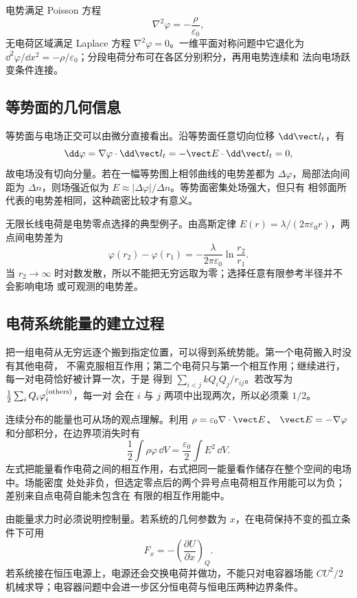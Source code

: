 电势满足 Poisson 方程
\begin{equation}
 \boxed{\nabla^2\varphi=-\frac\rho{\varepsilon_0}},
\end{equation}
无电荷区域满足 Laplace 方程 $\nabla^2\varphi=0$。一维平面对称问题中它退化为
$\dd^2\varphi/\dd x^2=-\rho/\varepsilon_0$；分段电荷分布可在各区分别积分，再用电势连续和
法向电场跃变条件连接。

\subsection*{等势面的几何信息}

等势面与电场正交可以由微分直接看出。沿等势面任意切向位移 $\dd\vect l_t$，有
\begin{equation}
 \dd\varphi=\nabla\varphi\cdot\dd\vect l_t
 =-\vect E\cdot\dd\vect l_t=0,
\end{equation}
故电场没有切向分量。若在一幅等势图上相邻曲线的电势差都为 $\Delta\varphi$，局部法向间距为
$\Delta n$，则场强近似为 $E\approx|\Delta\varphi|/\Delta n$。等势面密集处场强大，但只有
相邻面所代表的电势差相同，这种疏密比较才有意义。

无限长线电荷是电势零点选择的典型例子。由高斯定律
$E(r)=\lambda/(2\pi\varepsilon_0r)$，两点间电势差为
\begin{equation}
 \varphi(r_2)-\varphi(r_1)
 =-\frac\lambda{2\pi\varepsilon_0}\ln\frac{r_2}{r_1}.
\end{equation}
当 $r_2\to\infty$ 时对数发散，所以不能把无穷远取为零；选择任意有限参考半径并不会影响电场
或可观测的电势差。

\subsection*{电荷系统能量的建立过程}

把一组电荷从无穷远逐个搬到指定位置，可以得到系统势能。第一个电荷搬入时没有其他电荷，
不需克服相互作用；第二个电荷只与第一个相互作用；继续进行，每一对电荷恰好被计算一次，于是
得到 $\sum_{i<j}kQ_iQ_j/r_{ij}$。若改写为 $\frac12\sum_iQ_i\varphi_i^{(\rm others)}$，每一对
会在 $i$ 与 $j$ 两项中出现两次，所以必须乘 $1/2$。

连续分布的能量也可从场的观点理解。利用 $\rho=\varepsilon_0\nabla\cdot\vect E$、
$\vect E=-\nabla\varphi$ 和分部积分，在边界项消失时有
\begin{equation}
 \frac12\int\rho\varphi\,\dd V
 =\frac{\varepsilon_0}{2}\int E^2\,\dd V.
\end{equation}
左式把能量看作电荷之间的相互作用，右式把同一能量看作储存在整个空间的电场中。场能密度
处处非负，但选定零点后的两个异号点电荷相互作用能可以为负；差别来自点电荷自能未包含在
有限的相互作用能中。

由能量求力时必须说明控制量。若系统的几何参数为 $x$，在电荷保持不变的孤立条件下可用
\begin{equation}
 F_x=-\left(\frac{\partial U}{\partial x}\right)_Q.
\end{equation}
若系统接在恒压电源上，电源还会交换电荷并做功，不能只对电容器场能
$CU^2/2$ 机械求导；电容器问题中会进一步区分恒电荷与恒电压两种边界条件。

